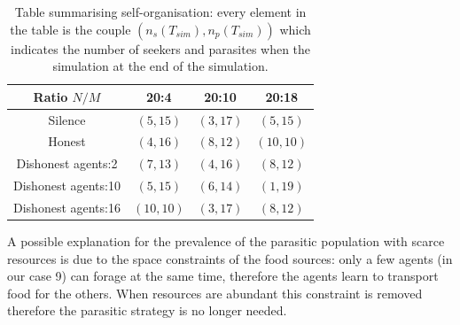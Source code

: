 \begin{table}[htbp]
\caption[Tabular results for self organisation property]{
Table summarising self-organisation:
every element in the table is the couple $(n_{s}(T_{sim}),n_{p}(T_{sim}))$
which indicates the number of seekers and parasites when the simulation
at the end of the simulation.\label{tab:population}}
\begin{center}
\small{
\begin{tabular}{@{}c|ccc@{}}
\hline
Ratio $N/M$ & 20:4 & 20:10 & 20:18\\
\hline
Silence & $(5,15)$ & $(3,17)$ & $(5,15)$\\
\hline
Honest & $(4,16)$ & $(8,12)$ & $(10,10)$\\
\hline
Dishonest agents:2  & $(7,13)$ & $(4,16)$ & $(8,12)$\\
Dishonest agents:10 & $(5,15)$ & $(6,14)$ & $(1,19)$\\
Dishonest agents:16 & $(10,10)$ & $(3,17)$ & $(8,12)$\\
\end{tabular}
}
\end{center}
\end{table}

A possible explanation for the prevalence of the parasitic population with scarce resources is due to the space constraints of the food sources: only a few agents (in our case 9) can forage at the same time, therefore the agents learn to transport food for the others. When resources are abundant this constraint is removed therefore the parasitic strategy is no longer needed.

